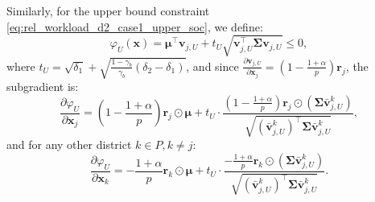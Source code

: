 \documentclass[preprint,12pt,authoryear]{elsarticle}
\begin{document}
Similarly, for the upper bound constraint \eqref{eq:rel_workload_d2_case1_upper_soc}, we define:
\begin{equation}
\varphi_U(\mathbf{x}) = \boldsymbol{\mu}^\top \mathbf{v}_{j,U} + t_U \sqrt{\mathbf{v}_{j,U}^\top \boldsymbol{\Sigma} \mathbf{v}_{j,U}} \leqslant 0,
\end{equation}
where $t_U = \sqrt{\delta_1} + \sqrt{\frac{1 - \gamma_b}{\gamma_b} (\delta_2 - \delta_1)}$, and since $\frac{\partial \mathbf{v}_{j,U}}{\partial \mathbf{x}_j} = \left(1 - \frac{1+\alpha}{p}\right) \mathbf{r}_j$, the subgradient is:
\begin{equation}
\frac{\partial \varphi_U}{\partial \mathbf{x}_j} = \left(1 - \frac{1+\alpha}{p}\right) \mathbf{r}_j \odot \boldsymbol{\mu} + t_U \cdot \frac{\left(1 - \frac{1+\alpha}{p}\right) \mathbf{r}_j \odot (\boldsymbol{\Sigma} \bar{\mathbf{v}}_{j,U}^k)}{\sqrt{(\bar{\mathbf{v}}_{j,U}^k)^{\top} \boldsymbol{\Sigma} \bar{\mathbf{v}}_{j,U}^k}},
\label{eq:rel_workload_d2_subgradient_U_j}
\end{equation}
and for any other district $k \in P, k \neq j$:
\begin{equation}
\frac{\partial \varphi_U}{\partial \mathbf{x}_k} = -\frac{1+\alpha}{p} \mathbf{r}_k \odot \boldsymbol{\mu} + t_U \cdot \frac{-\frac{1+\alpha}{p} \mathbf{r}_k \odot (\boldsymbol{\Sigma} \bar{\mathbf{v}}_{j,U}^k)}{\sqrt{(\bar{\mathbf{v}}_{j,U}^k)^{\top} \boldsymbol{\Sigma} \bar{\mathbf{v}}_{j,U}^k}}.
\label{eq:rel_workload_d2_subgradient_U_k}
\end{equation}
\end{document}
